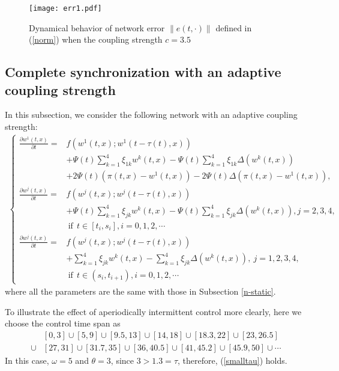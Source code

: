 \documentclass[review]{elsarticle}
\begin{document}
\begin{figure}
\begin{center}
\texttt{[image: err1.pdf]}
\end{center}
\caption{Dynamical behavior of network error $\|e(t,\cdot)\|$ defined in (\ref{norm}) when the coupling strength $c=3.5$}\label{wf5}
\end{figure}
\subsection{Complete synchronization with an adaptive coupling strength}
In this subsection, we consider the following network with an adaptive coupling strength:
\begin{align}\label{n-2}
\left\{
\begin{array}{cl}
\frac{\partial{w^1(t,x)}}{\partial{t}}=&f(w^1(t,x);w^1(t-\tau(t),x))\\
&+\Psi(t)\sum\limits_{k=1}^4\xi_{1k}
w^k(t,x)-\Psi(t)\sum\limits_{k=1}^4\xi_{1k}
\Delta(w^k(t,x))\\
&+2\Psi(t)(\pi(t,x)-w^1(t,x))-2\Psi(t)\Delta(\pi(t,x)-w^1(t,x)),\\
\frac{\partial{w^j(t,x)}}{\partial{t}}=&f(w^j(t,x);w^j(t-\tau(t),x))\\
&+\Psi(t)\sum\limits_{k=1}^4\xi_{jk}
w^k(t,x)-\Psi(t)\sum\limits_{k=1}^4\xi_{jk}
\Delta(w^k(t,x)), j=2,3,4,\\
&~\mathrm{if}~~t\in [t_i,s_i], i=0,1,2,\cdots\\
\frac{\partial{w^j(t,x)}}{\partial{t}}=&f(w^j(t,x);w^j(t-\tau(t),x))\\
&+\sum\limits_{k=1}^4\xi_{jk}
w^k(t,x)-\sum\limits_{k=1}^4\xi_{jk}
\Delta(w^k(t,x)), ~j=1,2,3,4,\\
&~\mathrm{if}~~t\in (s_i,t_{i+1}), i=0,1,2,\cdots
\end{array}
\right.
\end{align}
where all the parameters are the same with those in Subsection \ref{n-static}.

To illustrate the effect of aperiodically intermittent control more clearly, here we choose the control time span as
\begin{align*}
&[0,3]\cup [5,9]\cup [9.5,13]\cup [14,18]\cup [18.3,22]\cup [23,26.5]\\
\cup &[27,31]\cup
[31.7,35]\cup [36,40.5]\cup [41,45.2]\cup [45.9,50]\cup \cdots
\end{align*}
In this case, $\omega=5$ and $\theta=3$, since $3>1.3=\tau$, therefore, (\ref{smalltau}) holds.
\end{document}
